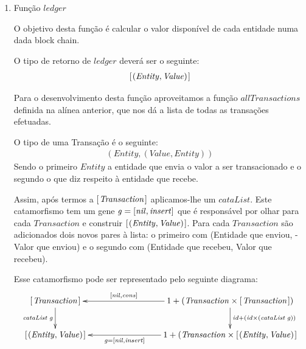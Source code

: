 \documentclass[a4paper]{article}
\newcommand{\Conid}[1]{\mathit{#1}}
\newcommand{\Varid}[1]{\mathit{#1}}
\begin{document}
\begin{enumerate}
\item Função \ensuremath{\Varid{ledger}}

O objetivo desta função é calcular o valor disponível de cada entidade numa
dada block chain.

O tipo de retorno de \ensuremath{\Varid{ledger}} deverá ser o seguinte:
\begin{eqnarray*}
\ensuremath{[\mskip1.5mu (\Conid{Entity},\Conid{Value})\mskip1.5mu]}
\end{eqnarray*}

Para o desenvolvimento desta função aproveitamos a função \ensuremath{\Varid{allTransactions}}
definida na alínea anterior, que nos dá a lista de todas as transações
efetuadas.

O tipo de uma Transação é o seguinte:
\begin{eqnarray*}
\ensuremath{(\Conid{Entity},(\Conid{Value},\Conid{Entity}))}
\end{eqnarray*}
Sendo o primeiro \ensuremath{\Conid{Entity}} a entidade que envia o valor a ser transacionado
e o segundo o que diz respeito à entidade que recebe.

Assim, após termos a \ensuremath{[\mskip1.5mu \Conid{Transaction}\mskip1.5mu]} aplicamos-lhe um \ensuremath{\Varid{cataList}}.
Este catamorfismo tem um gene \ensuremath{\Varid{g}\mathrel{=}\alt{\Varid{nil}}{\Varid{insert}}} que é responsável
por olhar para cada \ensuremath{\Conid{Transaction}} e construir \ensuremath{[\mskip1.5mu (\Conid{Entity},\Conid{Value})\mskip1.5mu]}.
Para cada \ensuremath{\Conid{Transaction}} são adicionados dois novos pares à lista: o primeiro
com (Entidade que enviou, - Valor que enviou) e o segundo com (Entidade que
recebeu, Valor que recebeu).


Esse catamorfismo pode ser representado pelo seguinte diagrama:
\begin{eqnarray*}
\xymatrix@C=3cm{
    \ensuremath{[\mskip1.5mu \Conid{Transaction}\mskip1.5mu]}
           \ar[d]_-{\ensuremath{\Varid{cataList}\;\Varid{g}}}
&
    \ensuremath{\mathrm{1}\mathbin{+}(\Conid{Transaction}\times[\mskip1.5mu \Conid{Transaction}\mskip1.5mu])}
           \ar[d]^{\ensuremath{\Varid{id}\mathbin{+}(\Varid{id}\times(\Varid{cataList}\;\Varid{g}))}}
           \ar[l]_-{\ensuremath{\alt{\Varid{nil}}{\Varid{cons}}}}
\\
     \ensuremath{[\mskip1.5mu (\Conid{Entity},\Conid{Value})\mskip1.5mu]}
&
     \ensuremath{\mathrm{1}\mathbin{+}(\Conid{Transaction}\times[\mskip1.5mu (\Conid{Entity},\Conid{Value})\mskip1.5mu]}
           \ar[l]^-{\ensuremath{\Varid{g}\mathrel{=}\alt{\Varid{nil}}{\Varid{insert}}}}
}
\end{eqnarray*}



\end{enumerate}
\end{document}
